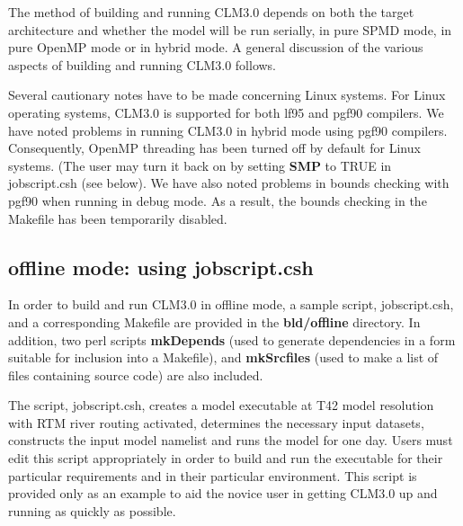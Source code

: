 The method of building and running CLM3.0 depends on both the target
architecture and whether the model will be run serially, in pure SPMD
mode, in pure OpenMP mode or in hybrid mode.  A general discussion of
the various aspects of building and running CLM3.0 follows.

Several cautionary notes have to be made concerning Linux systems.
For Linux operating systems, CLM3.0 is supported for both lf95 and
pgf90 compilers.  We have noted problems in running CLM3.0 in hybrid
mode using pgf90 compilers. Consequently, OpenMP threading has been
turned off by default for Linux systems.  (The user may turn it back
on by setting {\bf SMP} to TRUE in jobscript.csh (see below). We have
also noted problems in bounds checking with pgf90 when running in
debug mode.  As a result, the bounds checking in the Makefile has been
temporarily disabled. 

\subsection {offline mode: using jobscript.csh}

In order to build and run CLM3.0 in offline mode, a sample script,
jobscript.csh, and a corresponding Makefile are provided in the {\bf
bld/offline} directory. In addition, two perl scripts {\bf mkDepends}
(used to generate dependencies in a form suitable for inclusion into a
Makefile), and {\bf mkSrcfiles} (used to make a list of files
containing source code) are also included.

The script, jobscript.csh, creates a model executable at T42 model
resolution with RTM river routing activated, determines the necessary
input datasets, constructs the input model namelist and runs the model
for one day.  Users must edit this script appropriately in order to
build and run the executable for their particular requirements and in
their particular environment. This script is provided only as an
example to aid the novice user in getting CLM3.0 up and running as
quickly as possible.

